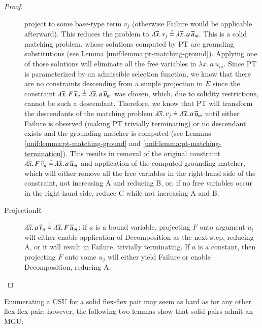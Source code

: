 \begin{proof}
\begin{description}
        project to some base-type term $v_j$ (otherwise \textsf{Failure} would
        be applicable afterward). This reduces the problem to $\lambda
        \overline{x}. \, v_j \unif \lambda \overline{x}. \, a \,
        \overline{u}_m$. This is a solid matching problem, whose solutions
        computed by PT are grounding substitutions (see Lemma
        \ref{unif:lemma:pt-matching-ground}). Applying one of those solutions will
        eliminate all the free variables in $\lambda \overline{x}.\, a \,
        \overline{u}_m$. Since PT is parameterized by an admissible
        selection function, we know that there are no constraints descending
        from a simple projection in $E$ since the constraint $\lambda \overline{x}. \, F
        \, \overline{v}_n \unif \lambda \overline{x}. \, a \, \overline{u}_m$ was
        chosen,
        which, due to solidity restrictions, cannot be such a descendant. 
        Therefore, we know that PT will transform the descendants
        of the matching problem $\lambda \overline{x}. \, v_j \unif \lambda
        \overline{x}.\, a \, \overline{u}_m$ until either \textsf{Failure} is
        observed (making PT trivially terminating) or no descendant exists
        and the grounding matcher is computed (see Lemmas
        \ref{unif:lemma:pt-matching-ground} and \ref{unif:lemma:pt-matching-termination}).
        This results in removal of the original constraint $\lambda
        \overline{x}. \, F \, \overline{v}_n \unif \lambda \overline{x}. \,
        a \, \overline{u}_m$ and application of the computed grounding
        matcher, which will either remove all the free variables in the right-hand
        side of the constraint, not increasing A and reducing B,
        or, if no free variables occur in the right-hand side, reduce C while not increasing A and B.
    \item[ProjectionR] $\lambda \overline{x}. \, a \, \overline{v}_n \unif \lambda
        \overline{x}. \, F \, \overline{u}_m$: 
        if $a$ is a bound variable, projecting $F$ onto argument $u_i$ will either enable
        application of \textsf{Decomposition} as the next step, reducing A, or it will result in \textsf{Failure},
        trivially terminating. If $a$ is a constant, then projecting $F$ onto some $u_j$
        will either yield  \textsf{Failure} or enable \textsf{Decomposition}, reducing A. \qedhere
    \end{description}
\end{proof}

Enumerating a CSU for a solid flex-flex pair may seem as hard as 
for any other flex-flex pair; however,
the following two lemmas show that solid pairs admit an MGU:

